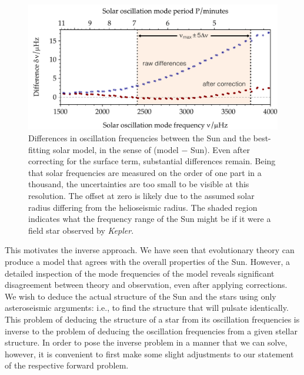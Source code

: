 \begin{figure}[t]
    \centering
    \includegraphics[width=\textwidth,keepaspectratio,trim={0cm 0cm 0cm 0.1cm}, clip]{figs/pulse/freq-diffs-solar.pdf}%
    \caption[The solar surface effect]{Differences in oscillation frequencies between the Sun and the best-fitting solar model, in the sense of (model $-$ Sun). 
    Even after correcting for the surface term, substantial differences remain. 
    Being that solar frequencies are measured on the order of one part in a thousand, the uncertainties are too small to be visible at this resolution. 
    The offset at zero is likely due to the assumed solar radius differing from the helioseismic radius. 
    The shaded region indicates what the frequency range of the Sun might be if it were a field star observed by \emph{Kepler}. 
    \label{fig:solar_freq_diffs}} 
\end{figure} 

This motivates the inverse approach. 
We have seen that evolutionary theory can produce a model that agrees with the overall properties of the Sun. 
However, a detailed inspection of the mode frequencies of the model reveals significant disagreement between theory and observation, even after applying corrections. 
We wish to deduce the actual structure of the Sun and the stars using only asteroseismic arguments: i.e., to find the structure that will pulsate identically. 
This problem of deducing the structure of a star from its oscillation frequencies is inverse to the problem of deducing the oscillation frequencies from a given stellar structure. 
In order to pose the inverse problem in a manner that we can solve, however, it is convenient to first make some slight adjustments to our statement of the respective forward problem. 



